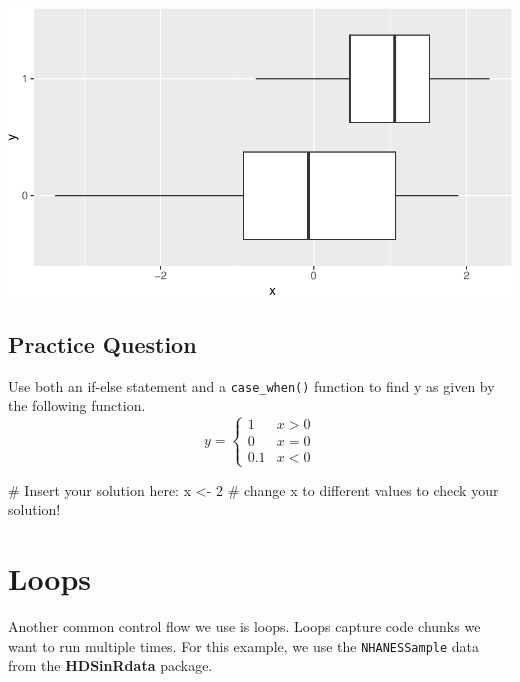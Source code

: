 \documentclass[
  letterpaper,
]{latex/krantz}
\makeatletter
\newenvironment{Shaded}{\begin{snugshade}}{\end{snugshade}}
\newcommand{\CommentTok}[1]{\textcolor[rgb]{0.37,0.37,0.37}{#1}}
\newcommand{\DecValTok}[1]{\textcolor[rgb]{0.68,0.00,0.00}{#1}}
\newcommand{\NormalTok}[1]{\textcolor[rgb]{0.00,0.23,0.31}{#1}}
\newcommand{\OtherTok}[1]{\textcolor[rgb]{0.00,0.23,0.31}{#1}}
\newenvironment{kframe}{%
\medskip{}
\setlength{\fboxsep}{.8em}
 \def\at@end@of@kframe{}%
 \ifinner\ifhmode%
  \def\at@end@of@kframe{\end{minipage}}%
  \begin{minipage}{\columnwidth}%
 \fi\fi%
 \def\FrameCommand##1{\hskip\@totalleftmargin \hskip-\fboxsep
 \colorbox{shadecolor}{##1}\hskip-\fboxsep
     \hskip-\linewidth \hskip-\@totalleftmargin \hskip\columnwidth}%
 \MakeFramed {\advance\hsize-\width
   \@totalleftmargin\z@ \linewidth\hsize
   \@setminipage}}%
 {\par\unskip\endMakeFramed%
 \at@end@of@kframe}
\renewenvironment{Shaded}{\begin{kframe}}{\end{kframe}}
\makeatother
\begin{document}
\begin{center}
\includegraphics[width=1\textwidth,height=\textheight]{book/control_flows_files/figure-pdf/unnamed-chunk-9-1.pdf}
\end{center}

\subsection{Practice Question}\label{practice-question-25}

Use both an if-else statement and a \texttt{case\_when()} function to
find y as given by the following function.
\[y = \begin{cases} 1 & x > 0 \\ 0 & x =0 \\ 0.1 & x < 0  \end{cases} \]

\begin{Shaded}
\begin{Highlighting}[]
\CommentTok{\# Insert your solution here:}
\NormalTok{x }\OtherTok{\textless{}{-}} \DecValTok{2} \CommentTok{\# change x to different values to check your solution!}
\end{Highlighting}
\end{Shaded}

\section{\texorpdfstring{Loops }{Loops }}\label{loops}

Another common control flow we use is loops. Loops capture code chunks
we want to run multiple times. For this example, we use the
\texttt{NHANESSample} data
 from the
\textbf{HDSinRdata} package.
\end{document}

